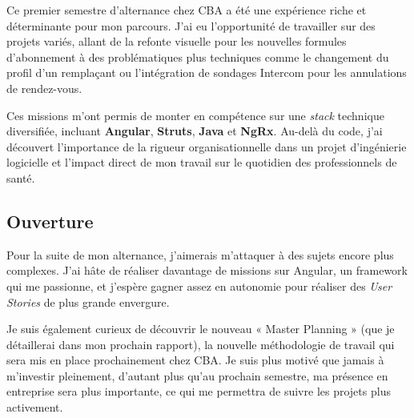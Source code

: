 \documentclass{article}
\begin{document}
Ce premier semestre d'alternance chez CBA a été une expérience riche et déterminante pour mon parcours. J'ai eu l'opportunité de travailler sur des projets variés, allant de la refonte visuelle pour les nouvelles formules d'abonnement à des problématiques plus techniques comme le changement du profil d'un remplaçant ou l'intégration de sondages Intercom pour les annulations de rendez-vous.

Ces missions m'ont permis de monter en compétence sur une \textit{stack} technique diversifiée, incluant \textbf{Angular}, \textbf{Struts}, \textbf{Java} et \textbf{NgRx}. Au-delà du code, j'ai découvert l'importance de la rigueur organisationnelle dans un projet d'ingénierie logicielle et l'impact direct de mon travail sur le quotidien des professionnels de santé.

\subsection{Ouverture}

Pour la suite de mon alternance, j'aimerais m'attaquer à des sujets encore plus complexes. J'ai hâte de réaliser davantage de missions sur Angular, un framework qui me passionne, et j'espère gagner assez en autonomie pour réaliser des \textit{User Stories} de plus grande envergure.

Je suis également curieux de découvrir le nouveau « Master Planning » (que je détaillerai dans mon prochain rapport), la nouvelle méthodologie de travail qui sera mis en place prochainement chez CBA. Je suis plus motivé que jamais à m'investir pleinement, d'autant plus qu'au prochain semestre, ma présence en entreprise sera plus importante, ce qui me permettra de suivre les projets plus activement.

\end{document}
